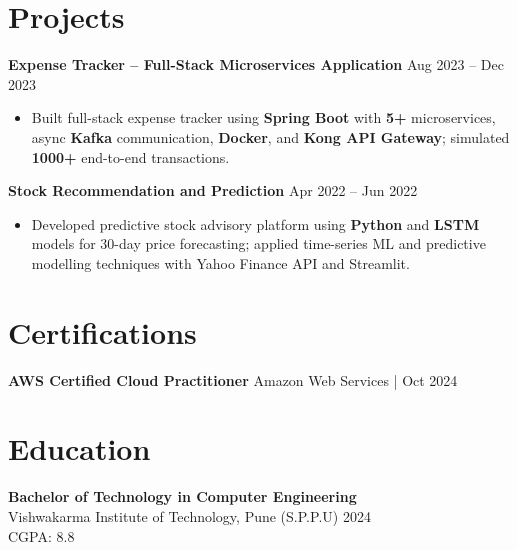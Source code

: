 \documentclass[letterpaper,10pt]{article}
\begin{document}
\section*{Projects}

\textbf{Expense Tracker -- Full-Stack Microservices Application} \hfill Aug 2023 -- Dec 2023
\begin{itemize}[leftmargin=*]
    \item Built full-stack expense tracker using \textbf{Spring Boot} with \textbf{5+} microservices, async \textbf{Kafka} communication, \textbf{Docker}, and \textbf{Kong API Gateway}; simulated \textbf{1000+} end-to-end transactions.
\end{itemize}

\textbf{Stock Recommendation and Prediction} \hfill Apr 2022 -- Jun 2022
\begin{itemize}[leftmargin=*]
    \item Developed predictive stock advisory platform using \textbf{Python} and \textbf{LSTM} models for 30-day price forecasting; applied time-series ML and predictive modelling techniques with Yahoo Finance API and Streamlit.
\end{itemize}

\section*{Certifications}
\textbf{AWS Certified Cloud Practitioner} \hfill Amazon Web Services \;|\; Oct 2024 \\

\section*{Education}
\textbf{Bachelor of Technology in Computer Engineering} \\
Vishwakarma Institute of Technology, Pune (S.P.P.U) \hfill 2024 \\
CGPA: 8.8
\end{document}
